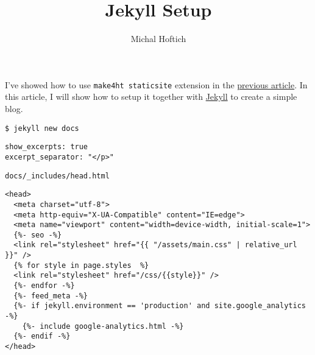\documentclass{article}
\title{Jekyll Setup}
\author{Michal Hoftich}
\def\makeht{\texttt{make4ht}}
\begin{document}
\maketitle

I've showed how to use \makeht\ \texttt{staticsite} extension
in the \href{/testblog/2021/07/30/how-to-blog-with-tex4ht.html}
{previous article}. In this article, I will show how to 
setup it together with \href{https://jekyllrb.com/}{Jekyll}
to create a simple blog.




\begin{verbatim}
$ jekyll new docs
\end{verbatim}

\begin{verbatim}
show_excerpts: true
excerpt_separator: "</p>"
\end{verbatim}


\begin{verbatim}
docs/_includes/head.html
\end{verbatim}

\begin{verbatim}
<head>
  <meta charset="utf-8">
  <meta http-equiv="X-UA-Compatible" content="IE=edge">
  <meta name="viewport" content="width=device-width, initial-scale=1">
  {%- seo -%}
  <link rel="stylesheet" href="{{ "/assets/main.css" | relative_url }}" />
  {% for style in page.styles  %}
  <link rel="stylesheet" href="/css/{{style}}" />
  {%- endfor -%}
  {%- feed_meta -%}
  {%- if jekyll.environment == 'production' and site.google_analytics -%}
    {%- include google-analytics.html -%}
  {%- endif -%}
</head>
\end{verbatim}
\end{document}
